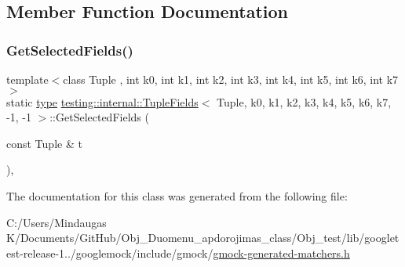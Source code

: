 \subsection{Member Function Documentation}
\mbox{\label{classtesting_1_1internal_1_1_tuple_fields_3_01_tuple_00_01k0_00_01k1_00_01k2_00_01k3_00_01k4_00_cda35487ca7d3bd5a9557919642ae14b_a51eb7795e93b4a6be753d5891da04b9f}} 
\subsubsection{\texorpdfstring{GetSelectedFields()}{GetSelectedFields()}}
{\footnotesize\ttfamily template$<$class Tuple , int k0, int k1, int k2, int k3, int k4, int k5, int k6, int k7$>$ \\
static \mbox{\hyperlink{classtesting_1_1internal_1_1_tuple_fields_3_01_tuple_00_01k0_00_01k1_00_01k2_00_01k3_00_01k4_00_cda35487ca7d3bd5a9557919642ae14b_a4ca1e3e9805d5f38ac371529b67496d2}{type}} \mbox{\hyperlink{classtesting_1_1internal_1_1_tuple_fields}{testing\+::internal\+::\+Tuple\+Fields}}$<$ Tuple, k0, k1, k2, k3, k4, k5, k6, k7, -\/1, -\/1 $>$\+::Get\+Selected\+Fields (\begin{DoxyParamCaption}\item[{const Tuple \&}]{t }\end{DoxyParamCaption})\hspace{0.3cm}{\ttfamily [inline]}, {\ttfamily [static]}}



The documentation for this class was generated from the following file\+:\begin{DoxyCompactItemize}
\item 
C\+:/\+Users/\+Mindaugas K/\+Documents/\+Git\+Hub/\+Obj\+\_\+\+Duomenu\+\_\+apdorojimas\+\_\+class/\+Obj\+\_\+test/lib/googletest-\/release-\/1../googlemock/include/gmock/\mbox{\hyperlink{_obj__test_2lib_2googletest-release-1_88_81_2googlemock_2include_2gmock_2gmock-generated-matchers_8h}{gmock-\/generated-\/matchers.\+h}}\end{DoxyCompactItemize}
